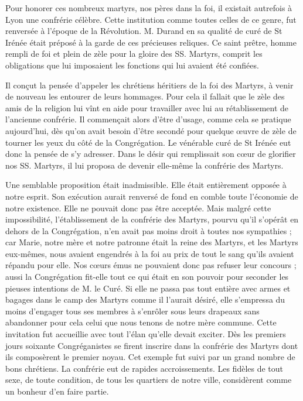 Pour honorer ces nombreux martyrs, nos pères dans la foi, il
existait autrefois à Lyon une confrérie célèbre. Cette institution comme toutes celles de ce genre, fut renversée à l'époque de la Révolution. M. Durand en sa qualité de curé de St Irénée était préposé à la garde de ces précieuses reliques. Ce saint prêtre, homme rempli de foi et plein de zèle pour la gloire des SS. Martyrs, comprit les obligations que lui imposaient les fonctions qui lui avaient été confiées.

Il conçut la pensée d'appeler les chrétiens héritiers de la foi des Martyrs, à venir de nouveau les entourer de leurs hommages. Pour cela il fallait que le zèle des amis de la religion lui vînt en aide pour travailler avec lui au rétablissement de l'ancienne confrérie. Il commençait alors d'être d'usage, comme cela se pratique aujourd'hui, dès qu'on avait besoin d'être secondé pour quelque œuvre de zèle de tourner les yeux du côté de la Congrégation. Le vénérable curé de St Irénée eut donc la pensée de s'y adresser. Dans le désir qui remplissait son cœur de glorifier nos SS. Martyrs, il lui proposa de devenir elle-même la confrérie des Martyrs.

Une semblable proposition était inadmissible. Elle était entièrement opposée à notre esprit. Son exécution aurait renversé de fond en comble toute l'économie de notre existence. Elle ne pouvait donc pas être acceptée. Mais malgré cette impossibilité, l'établissement de la confrérie des Martyrs, pourvu qu'il s'opérât en dehors de la Congrégation, n'en avait pas moins droit à toutes nos sympathies ; car Marie, notre mère et notre patronne était la reine des Martyrs, et les Martyrs eux-mêmes, nous avaient engendrés à la foi au prix de tout le sang qu'ils avaient répandu pour elle. Nos
cœurs émus ne pouvaient donc pas refuser leur concours ; aussi la Congrégation fit-elle tout ce qui était en son pouvoir pour seconder les pieuses intentions de M. le Curé. Si elle ne passa pas tout entière avec armes et bagages dans le camp des Martyrs comme il l'aurait désiré, elle s'empressa du moins d'engager tous ses membres à s'enrôler sous leurs drapeaux sans abandonner pour cela celui que nous tenons de notre mère commune. Cette invitation fut accueillie avec tout l'élan qu'elle devait exciter. Dès les premiers jours soixante Congréganistes se firent inscrire dans la confrérie des Martyrs dont ils composèrent le premier noyau. Cet exemple fut suivi par un grand nombre de bons chrétiens. La confrérie eut de rapides accroissements. Les fidèles de tout sexe, de toute condition, de tous les quartiers de notre ville, considèrent comme un bonheur d'en faire partie.


